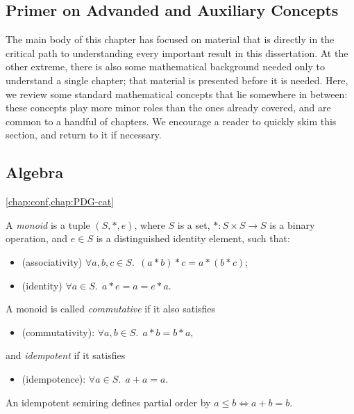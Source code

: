 \begin{subappendices}    
\section{Primer on Advanded and Auxiliary Concepts}
The main body of this chapter has focused on material that is directly in the critical path to understanding every important result in this dissertation. 
%
At the other extreme, there is also some mathematical background needed only to understand a single chapter; that material is presented before it is needed. 
%
Here, we review some standard mathematical concepts that lie somewhere in between: these concepts play more minor roles than the ones already covered, and are common to a handful of chapters. 
%
%
We encourage a reader to quickly skim this section,
    and return to it if necessary. 


\subsection{Algebra}
\cref{chap:conf,chap:PDG-cat}

\begin{defn}[Monoid]%
    A \emph{monoid} is a tuple $(S, *, e)$, where $S$ is a set, $* : S \times S \to S$ is a binary operation, and $e \in S$ is a distinguished identity element, such that:
    \begin{itemize}[itemsep=0pt,parsep=0pt,topsep=0pt,]
        \item (associativity) $\forall a, b,c \in S.~~(a*b)*c = a*(b*c)$;
        \item (identity) $\forall a \in S.~~a * e = a = e * a$.
    \end{itemize}
    A monoid is called \emph{commutative} if it also satisfies
    \begin{itemize}[nosep]
        \item (commutativity): $\forall a, b \in S.~~ a * b = b * a$,
    \end{itemize}
    and \emph{idempotent} if it satisfies
    \begin{itemize}[nosep]
        \item (idempotence): $\forall a \in S.~~ a + a = a$. 
    \end{itemize}
    An idempotent semiring defines partial order by $a \le b \iff a + b = b$. 
\end{defn}


\end{subappendices}
